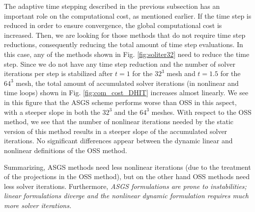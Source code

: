 The adaptive time stepping described in the previous subsection has an important role on the computational cost, as mentioned earlier. If the time step is reduced in order to ensure convergence, the global computational cost is increased. Then, we are looking for those methods that do not require time step reductions, consequently reducing the total amount of time step evaluations. In this case, any of the methods shown in Fig. \ref{fig:soliter32} need to reduce the time step. Since we do not have any time step reduction and the number of solver iterations per step is stabilized after $t=1$ for the $32^3$ mesh and $t=1.5$ for the $64^3$ mesh, the total amount of accumulated solver iterations (in nonlinear and time loops) shown in Fig. \ref{fig:com_cost_DHIT} increases almost linearly. We see in this figure that the ASGS scheme performs worse than OSS in this aspect, with a steeper slope in both the  $32^3$ and the $64^3$ meshes. With respect to the OSS method, we see that the number of nonlinear iterations needed by the static version of this method results in a steeper slope of the accumulated solver iterations. No significant differences appear between the dynamic linear and nonlinear definitions of the OSS method.

Summarizing, ASGS methods need less nonlinear iterations (due to the treatment of the projections in the OSS method), but on the other hand  OSS methods need less solver iterations. Furthermore, \emph{ASGS formulations are prone to instabilities; linear formulations diverge and the nonlinear dynamic formulation requires much more solver iterations.}

